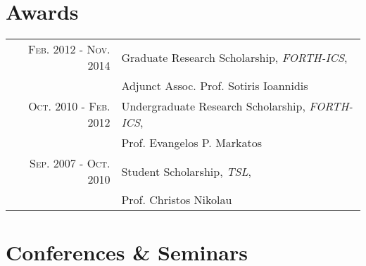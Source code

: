 \documentclass[a4paper,10pt]{article} %
\begin{document}

\section{Awards}

\begin{tabular}{rl}

\textsc{Feb. 2012 - Nov. 2014} & Graduate Research Scholarship, \emph{FORTH-ICS}, \\
& Adjunct Assoc. Prof. Sotiris Ioannidis \\

\textsc{Oct. 2010 - Feb. 2012} & Undergraduate Research Scholarship, \emph{FORTH-ICS}, \\
& Prof. Evangelos P.  Markatos \\


\textsc{Sep. 2007 - Oct. 2010} & Student Scholarship, \emph{TSL}, \\
& Prof. Christos Nikolau \\

\end{tabular}


\section{Conferences \& Seminars}
\end{document}
